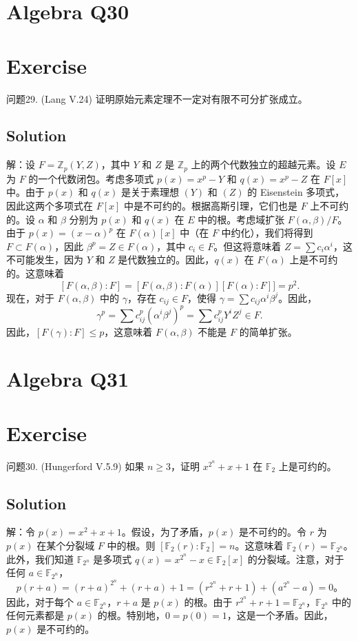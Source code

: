 \documentclass[12pt]{book}
\begin{document}
\section{Algebra Q30}
\section*{Exercise}
问题29. (Lang V.24) 证明原始元素定理不一定对有限不可分扩张成立。



\subsection*{Solution}
解：设 $F = \mathbb{Z}_p(Y, Z)$，其中 $Y$ 和 $Z$ 是 $\mathbb{Z}_p$ 上的两个代数独立的超越元素。设 $E$ 为 $F$ 的一个代数闭包。考虑多项式 $p(x) = x^p - Y$ 和 $q(x) = x^p - Z$ 在 $F[x]$ 中。由于 $p(x)$ 和 $q(x)$ 是关于素理想 $(Y)$ 和 $(Z)$ 的 Eisenstein 多项式，因此这两个多项式在 $F[x]$ 中是不可约的。根据高斯引理，它们也是 $F$ 上不可约的。设 $\alpha$ 和 $\beta$ 分别为 $p(x)$ 和 $q(x)$ 在 $E$ 中的根。考虑域扩张 $F(\alpha, \beta)/F$。由于 $p(x) = (x - \alpha)^p$ 在 $F(\alpha)[x]$ 中（在 $F$ 中约化），我们将得到 $F \subset F(\alpha)$，因此 $\beta^p = Z \in F(\alpha)$，其中 $c_i \in F$。但这将意味着 $Z = \sum c_i \alpha^i$，这不可能发生，因为 $Y$ 和 $Z$ 是代数独立的。因此，$q(x)$ 在 $F(\alpha)$ 上是不可约的。这意味着
\[[F(\alpha, \beta) : F] = [F(\alpha, \beta) : F(\alpha)][F(\alpha) : F]] = p^2.\]
现在，对于 $F(\alpha, \beta)$ 中的 $\gamma$，存在 $c_{ij} \in F$，使得 $\gamma = \sum c_{ij} \alpha^i \beta^j$。因此，
\[\gamma^p = \sum c_{ij}^p (\alpha^i \beta^j)^p = \sum c_{ij}^p Y^i Z^j \in F.\]
因此，$[F(\gamma) : F] \le p$，这意味着 $F(\alpha, \beta)$ 不能是 $F$ 的简单扩张。
\newpage
\section{Algebra Q31}
\section*{Exercise}
问题30. (Hungerford V.5.9) 如果 $n \ge 3$，证明 $x^{2^n} + x + 1$ 在 $\mathbb{F}_2$ 上是可约的。



\subsection*{Solution}
解：令 $p(x) = x^2 + x + 1$。假设，为了矛盾，$p(x)$ 是不可约的。令 $r$ 为 $p(x)$ 在某个分裂域 $F$ 中的根。则 $[\mathbb{F}_2(r) : \mathbb{F}_2] = n$。这意味着 $\mathbb{F}_2(r) = \mathbb{F}_{2^n}$。此外，我们知道 $\mathbb{F}_{2^n}$ 是多项式 $q(x) = x^{2^n} - x \in \mathbb{F}_2[x]$ 的分裂域。注意，对于任何 $a \in \mathbb{F}_{2^n}$，
\[ p(r+a) = (r+a)^{2^n} + (r+a) + 1 = (r^{2^n} + r + 1) + (a^{2^n} - a) = 0。 \]
因此，对于每个 $a \in \mathbb{F}_{2^n}$，$r+a$ 是 $p(x)$ 的根。由于 $r^{2^n} + r + 1 = \mathbb{F}_{2^n}$，$\mathbb{F}_{2^n}$ 中的任何元素都是 $p(x)$ 的根。特别地，$0 = p(0) = 1$，这是一个矛盾。因此，$p(x)$ 是不可约的。
\newpage
\end{document}
